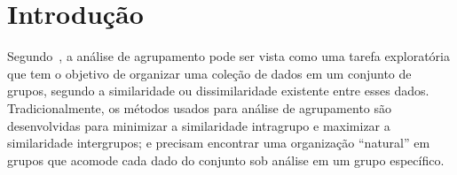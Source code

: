 \documentclass[
    12pt,                %
    oneside,            %
    a4paper,            %
    english,            %
    brazil                %
    ]{abntex2ppgsi}
\begin{document}
\tableofcontents*
\cleardoublepage



\textual



%
%
%




\chapter{Introdução}

Segundo~, a análise de agrupamento pode ser vista como uma tarefa exploratória que tem o objetivo de organizar uma coleção de dados em um conjunto de grupos, segundo a similaridade ou dissimilaridade existente entre esses dados. Tradicionalmente, os métodos usados para análise de agrupamento são desenvolvidas para minimizar a similaridade intragrupo e maximizar a similaridade intergrupos; e precisam encontrar uma organização ``natural'' em grupos que acomode cada dado do conjunto sob análise em um grupo específico.
\end{document}
